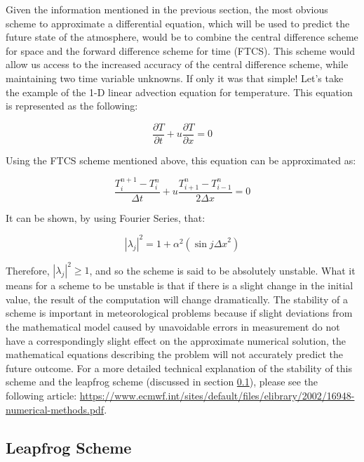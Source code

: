 Given the information mentioned in the previous section, the most obvious scheme to approximate a differential equation, which will be used to predict the future state of the atmosphere, would be to combine the central difference scheme for space and the forward difference scheme for time (FTCS). This scheme would allow us access to the increased accuracy of the central difference scheme, while maintaining two time variable unknowns. If only it was that simple! Let's take the example of the 1-D linear advection equation for temperature. This equation is represented as the following:

\begin{equation}
    \frac{\partial T}{\partial t} + u \frac{\partial T}{\partial x} = 0
    \label{1d_temp_eq}
\end{equation}

Using the FTCS scheme mentioned above, this equation can be approximated as:

\begin{equation}
    \frac{T^{n+1}_{i} - T^{n}_{i}}{\Delta t} + u \frac{T^{n}_{i+1} - T^{n}_{i-1}}{2 \Delta x} = 0
\end{equation}

It can be shown, by using Fourier Series, that:

\begin{equation}
    |\lambda_j|^2 = 1 + \alpha^2(\sin{j \Delta x}^2)
\end{equation}

Therefore, $|\lambda_j|^2 \geq 1$, and so the scheme is said to be absolutely unstable. What it means for a scheme to be unstable is that if there is a slight change in the initial value, the result of the computation will change dramatically. The stability of a scheme is important in meteorological problems because if slight deviations from the mathematical model caused by unavoidable errors in measurement do not have a correspondingly slight effect on the approximate numerical solution, the mathematical equations describing the problem will not accurately predict the future outcome\cite{ftcs_leapfrog}. For a more detailed technical explanation of the stability of this scheme and the leapfrog scheme (discussed in section \ref{leapfrog}), please see the following article: \url{https://www.ecmwf.int/sites/default/files/elibrary/2002/16948-numerical-methods.pdf}.

\subsection{Leapfrog Scheme}\label{leapfrog}

